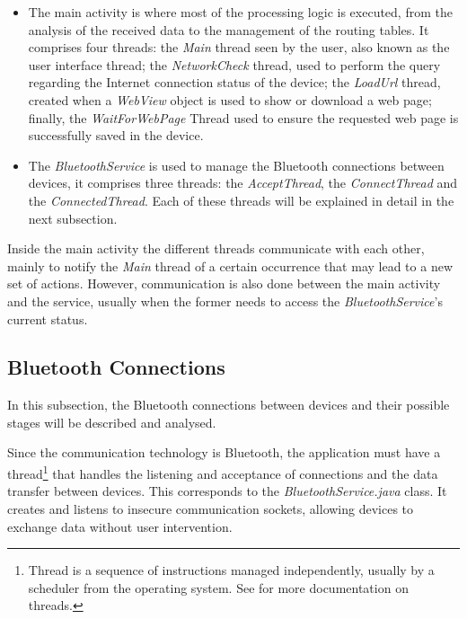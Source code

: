 \begin{itemize}

\item The main activity is where most of the processing logic is executed, from the analysis of the received data to the management of the routing tables. It comprises four threads: the \textit{Main} thread seen by the user, also known as the user interface thread; the \textit{NetworkCheck} thread, used to perform the query regarding the Internet connection status of the device; the \textit{LoadUrl} thread, created when a \textit{WebView} object is used to show or download a web page; finally, the \textit{WaitForWebPage} Thread used to ensure the requested web page is successfully saved in the device.

\item The \textit{BluetoothService} is used to manage the Bluetooth connections between devices, it comprises three threads: the \textit{AcceptThread}, the \textit{ConnectThread} and the \textit{ConnectedThread}. Each of these threads will be explained in detail in the next subsection.

\end{itemize}

Inside the main activity the different threads communicate with each other, mainly to notify the \textit{Main} thread of a certain occurrence that may lead to a new set of actions. However, communication is also done between the main activity and the service, usually when the former needs to access the \textit{BluetoothService}'s current status.

\subsection{Bluetooth Connections}
\label{subsec:btconn}

In this subsection, the Bluetooth connections between devices and their possible stages will be described and analysed.

Since the communication technology is Bluetooth, the application must have a thread\footnote{Thread is a sequence of instructions managed independently, usually by a scheduler from the operating system. See \cite{threads} for more documentation on threads.} that handles the listening and acceptance of connections and the data transfer between devices. This corresponds to the \textit{BluetoothService.java} class. It creates and listens to insecure communication sockets, allowing devices to exchange data without user intervention.

